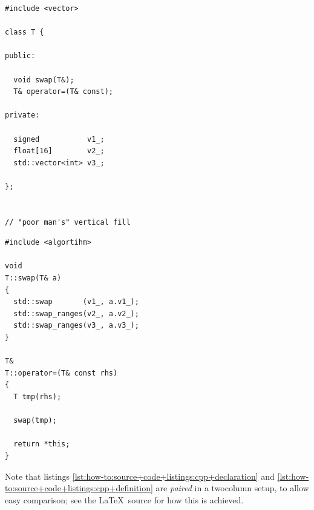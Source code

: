 \begin{multicols}{2}
\begin{lstlisting}[language=c++11,caption={A C++ source-code fragment, declaration},label={lst:how-to:source+code+listings:cpp+declaration}]
#include <vector>

class T {

public:

  void swap(T&);
  T& operator=(T& const);

private:

  signed           v1_;
  float[16]        v2_;
  std::vector<int> v3_;

};


// "poor man's" vertical fill
\end{lstlisting}
\vfill
\begin{lstlisting}[language=c++11,caption={A C++ source-code fragment, definition},label={lst:how-to:source+code+listings:cpp+definition}]
#include <algortihm>

void
T::swap(T& a)
{
  std::swap       (v1_, a.v1_);
  std::swap_ranges(v2_, a.v2_);
  std::swap_ranges(v3_, a.v3_);
}

T&
T::operator=(T& const rhs)
{
  T tmp(rhs);

  swap(tmp);

  return *this;
}
\end{lstlisting}
\end{multicols}
Note that listings \ref{lst:how-to:source+code+listings:cpp+declaration} and
\ref{lst:how-to:source+code+listings:cpp+definition} are {\em paired} in a twocolumn setup, to allow
easy comparison; see the \LaTeX\ source for how this is achieved.
\par

